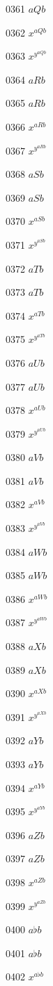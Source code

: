 \documentclass{article}
\begin{document}
0361 $\displaystyle aQb$\par
0362 $x^{aQb}$\par
0363 $x^{y^{aQb}}$\par
0364 $aRb$\par
0365 $\displaystyle aRb$\par
0366 $x^{aRb}$\par
0367 $x^{y^{aRb}}$\par
0368 $aSb$\par
0369 $\displaystyle aSb$\par
0370 $x^{aSb}$\par
0371 $x^{y^{aSb}}$\par
0372 $aTb$\par
0373 $\displaystyle aTb$\par
0374 $x^{aTb}$\par
0375 $x^{y^{aTb}}$\par
0376 $aUb$\par
0377 $\displaystyle aUb$\par
0378 $x^{aUb}$\par
0379 $x^{y^{aUb}}$\par
0380 $aVb$\par
0381 $\displaystyle aVb$\par
0382 $x^{aVb}$\par
0383 $x^{y^{aVb}}$\par
0384 $aWb$\par
0385 $\displaystyle aWb$\par
0386 $x^{aWb}$\par
0387 $x^{y^{aWb}}$\par
0388 $aXb$\par
0389 $\displaystyle aXb$\par
0390 $x^{aXb}$\par
0391 $x^{y^{aXb}}$\par
0392 $aYb$\par
0393 $\displaystyle aYb$\par
0394 $x^{aYb}$\par
0395 $x^{y^{aYb}}$\par
0396 $aZb$\par
0397 $\displaystyle aZb$\par
0398 $x^{aZb}$\par
0399 $x^{y^{aZb}}$\par
0400 $a\flat b$\par
0401 $\displaystyle a\flat b$\par
0402 $x^{a\flat b}$\par
\end{document}
